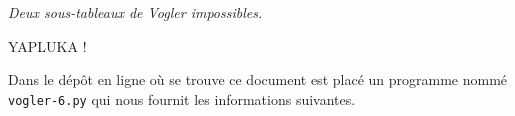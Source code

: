 \begin{center}
	
	\smallskip
	
	\emph{\small Deux sous-tableaux de Vogler impossibles.}
\end{center}


{\Huge YAPLUKA !}

Dans le dépôt en ligne où se trouve ce document est placé un programme nommé \verb#vogler-6.py# qui nous fournit les informations suivantes.
